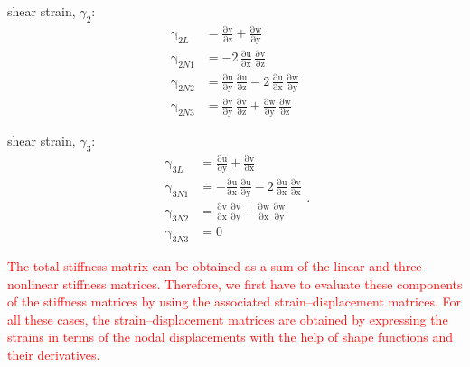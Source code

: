 shear strain, $\gamma_2$:
\begin{subequations}
	\begin{align}
	\mathrm \gamma_{2L} & = \mathrm{\frac{\partial v}{\partial z}} + \mathrm{\frac{\partial w}{\partial y}}\\
	\mathrm \gamma_{2N1} & =  - 2 \, \mathrm{\frac{ \partial u}{\partial x}}\, \mathrm{\frac{ \partial v}{\partial z}}\\
	\mathrm \gamma_{2N2} & = \mathrm{\frac{\partial u}{\partial y}}\, \mathrm{\frac{\partial u}{\partial z}} - 2 \, \mathrm{\frac{\partial u}{\partial x}}\, \mathrm{\frac{\partial w}{\partial y}}\\
	\mathrm \gamma_{2N3} & = \mathrm{\frac{\partial v}{\partial y}}\, \mathrm{\frac{\partial v}{\partial z}} + \mathrm{\frac{\partial w}{\partial y}}\, \mathrm{\frac{\partial w}{\partial z}}
	\end{align}
\end{subequations}

shear strain, $\gamma_3$:
\begin{subequations}
	\begin{align}
	\mathrm \gamma_{3L} & = \mathrm{\frac{\partial u}{\partial y}} + \mathrm{\frac{\partial v}{\partial x}}\\
	\mathrm \gamma_{3N1} & = - \mathrm{\frac{\partial u}{\partial x}}\, \mathrm{\frac{\partial u}{\partial y}} - 2 \, \mathrm{\frac{ \partial u}{\partial x}}\, \mathrm{\frac{ \partial v}{\partial x}}\\
	\mathrm \gamma_{3N2} & = \mathrm{\frac{\partial v}{\partial x}}\, \mathrm{\frac{\partial v}{\partial y}} + \mathrm{\frac{\partial w}{\partial x}}\, \mathrm{\frac{\partial w}{\partial y}}\\
	\mathrm \gamma_{3N3} & = 0
	\end{align}.
\end{subequations}

\textcolor{red}{The total stiffness matrix can be obtained as a sum of the linear and three nonlinear stiffness matrices. Therefore, we first have to evaluate these components of the stiffness matrices by using the associated strain--displacement matrices. For all these cases, the strain--displacement matrices are obtained by expressing the strains in terms of the nodal displacements with the help of shape functions and their derivatives.}

